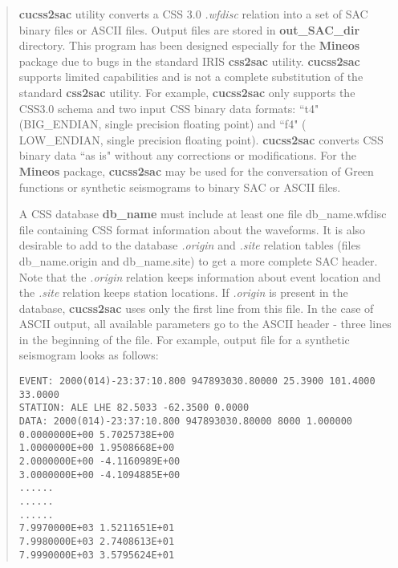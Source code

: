 \begin{quote}
\vred
{\bf cucss2sac} utility converts a CSS 3.0 {\it .wfdisc} relation into a set 
of SAC binary files or  ASCII files. Output files are stored in 
{\bf out\_SAC\_dir} directory. This program has been designed 
especially for the {\bf Mineos} package due to bugs in the standard IRIS 
{\bf css2sac} utility. {\bf cucss2sac} supports limited capabilities 
and is not a complete substitution of the standard {\bf css2sac} 
utility. For example, {\bf cucss2sac} only supports the CSS3.0 schema 
and two input CSS binary data formats: ``t4" (BIG\_ENDIAN, single 
precision floating point) and ``f4" ( LOW\_ENDIAN, single precision 
floating point). {\bf cucss2sac} converts CSS binary data ``as is" 
without any corrections or modifications. For the {\bf Mineos} package, 
{\bf cucss2sac} may be used for the conversation of Green functions 
or synthetic seismograms to binary SAC or ASCII files.

A CSS database {\bf db\_name} must include at least one file 
db\_name.wfdisc file containing CSS format information about the 
waveforms. It is also desirable to add to the database {\it .origin} and 
{\it .site} relation tables (files db\_name.origin and db\_name.site) 
to get a more complete SAC header.
Note that the {\it .origin} relation keeps information about event location 
and the {\it .site} relation keeps station locations. If {\it .origin} is present 
in the database, {\bf cucss2sac} uses only the first line from this 
file. In the case of ASCII output, all available parameters go to the
ASCII header - three lines in the beginning of the file. 
For example, output file for a synthetic seismogram looks as follows:

\texttt{EVENT:   2000(014)-23:37:10.800 947893030.80000 25.3900 101.4000 33.0000 \\
   STATION: ALE     LHE       82.5033  -62.3500  0.0000 \\
   DATA:    2000(014)-23:37:10.800  947893030.80000  8000 1.000000 \\
     0.0000000E+00   5.7025738E+00 \\
     1.0000000E+00   1.9508668E+00 \\
     2.0000000E+00  -4.1160989E+00 \\
     3.0000000E+00  -4.1094885E+00 \\
          ...... \\
          ...... \\
          ...... \\
     7.9970000E+03   1.5211651E+01 \\
     7.9980000E+03   2.7408613E+01 \\
     7.9990000E+03   3.5795624E+01}


\end{quote}
